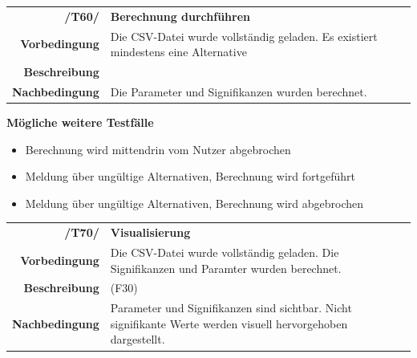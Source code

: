 \documentclass{article}
\begin{document}


\begin{table}[H]
\begin{tabularx}{\textwidth}{rX}
\textbf{/T60/}         & \textbf{Berechnung durchführen} \\
\textbf{Vorbedingung}  & Die CSV-Datei wurde vollständig geladen. Es existiert mindestens eine Alternative \\
\textbf{Beschreibung}  &  \\
\textbf{Nachbedingung} & Die Parameter und Signifikanzen wurden berechnet.
\end{tabularx}
\end{table}
\textbf{Mögliche weitere Testfälle}
\begin{itemize}
    \item Berechnung wird mittendrin vom Nutzer abgebrochen
    \item Meldung über ungültige Alternativen, Berechnung wird fortgeführt
    \item Meldung über ungültige Alternativen, Berechnung wird abgebrochen
\end{itemize}

\begin{table}[H]
\begin{tabularx}{\textwidth}{rX}
\textbf{/T70/}         & \textbf{Visualisierung} \\
\textbf{Vorbedingung}  & Die CSV-Datei wurde vollständig geladen. Die Signifikanzen und Paramter wurden berechnet. \\
\textbf{Beschreibung}  & (F30) \\
\textbf{Nachbedingung} & Parameter und Signifikanzen sind sichtbar. Nicht signifikante Werte werden visuell hervorgehoben dargestellt.
\end{tabularx}
\end{table}
\end{document}
